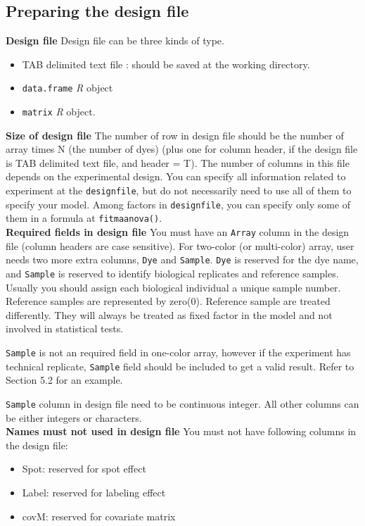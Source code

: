 \subsection{Preparing the design file}
{\bf Design file} Design file can be three kinds of type.
\begin{itemize}
\item TAB delimited text file : should be saved at the working directory.
\item {\tt data.frame} {\em R} object
\item {\tt matrix} {\em R} object. 
\end{itemize}
{\bf Size of design file} The number of row in design file should be the
number of array times N (the number of dyes) (plus one for column header, if
the design file is TAB delimited text file, and header = T). The number of columns in this file depends on the experimental design. You can
specify all information related to experiment at the {\tt designfile}, but do
not necessarily need to use all of them to specify your model. Among factors
in {\tt designfile}, you can specify only some of them in a formula at {\tt fitmaanova()}.\\
{\bf Required fields in design file} You must have an {\tt Array} column in the
design file (column headers are case sensitive). For two-color (or
multi-color) array, user needs two more extra columns, {\tt Dye} and {\tt Sample}. {\tt Dye} is reserved for the dye
name, and {\tt Sample} is reserved to identify biological replicates and
reference samples. Usually you should assign each biological individual a
unique sample number. Reference samples are represented by zero(0). Reference
sample are treated differently. They will always be treated as fixed factor in
the model and not involved in statistical tests. 

{\tt Sample} is not an
required field in one-color array, however if the experiment has technical
replicate, {\tt Sample} field should be included to get a valid result. Refer
to Section 5.2 for an example.  

{\tt Sample} column in design file
need to be continuous integer. All other columns can be either integers or
characters. \\
{\bf Names must not used in design file} You must not have following columns in the design file:
\begin{itemize}
\item Spot: reserved for spot effect
\item Label: reserved for labeling effect
\item covM: reserved for covariate matrix 
\end{itemize}


